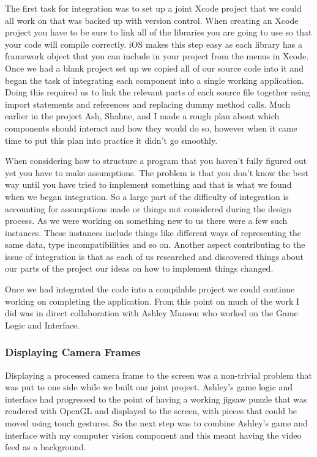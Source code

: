 \documentclass{article}
\begin{document}
The first task for integration was to set up a joint Xcode project that we could all work on that was backed up with version control. When creating an Xcode project you have to be sure to link all of the libraries you are going to use so that your code will compile correctly. iOS makes this step easy as each library has a framework object that you can include in your project from the menus in Xcode. Once we had a blank project set up we copied all of our source code into it and began the task of integrating each component into a single working application. Doing this required us to link the relevant parts of each source file together using import statements and references and replacing dummy method calls. Much earlier in the project Ash, Shahne, and I made a rough plan about which components should interact and how they would do so, however when it came time to put this plan into practice it didn't go smoothly. 

When considering how to structure a program that you haven't fully figured out yet you have to make assumptions. The problem is that you don't know the best way until you have tried to implement something and that is what we found when we began integration. So a large part of the difficulty of integration is accounting for assumptions made or things not considered during the design process. As we were working on something new to us there were a few such instances. These instances include things like different ways of representing the same data, type incompatibilities and so on. Another aspect contributing to the issue of integration is that as each of us researched and discovered things about our parts of the project our ideas on how to implement things changed.

Once we had integrated the code into a compilable project we could continue working on completing the application. From this point on much of the work I did was in direct collaboration with Ashley Manson who worked on the Game Logic and Interface. 

\subsubsection{Displaying Camera Frames}

Displaying a processed camera frame to the screen was a non-trivial problem that was put to one side while we built our joint project. Ashley's game logic and interface had progressed to the point of having a working jigsaw puzzle that was rendered with OpenGL and displayed to the screen, with pieces that could be moved using touch gestures. So the next step was to combine Ashley's game and interface with my computer vision component and this meant having the video feed as a background. 
\end{document}
